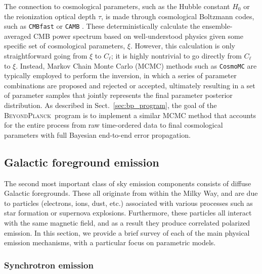 \documentclass[onecolumn]{aa}
\newcommand{\BP}{\textsc{BeyondPlanck}}
\begin{document}
The connection to cosmological parameters, such as the Hubble constant
$H_0$ or the reionization optical depth $\tau$, is made through
cosmological Boltzmann codes, such as \texttt{CMBfast}
\citep{seljak:1996} or \texttt{CAMB} \citep{Lewis:1999bs}. These
deterministically calculate the ensemble-averaged CMB power spectrum
based on well-understood physics given some specific set of
cosmological parameters, $\xi$. However, this calculation is only
straightforward going from $\xi$ to $C_{\ell}$; it is highly
nontrivial to go directly from $C_{\ell}$ to $\xi$. Instead, Markov
Chain Monte Carlo (MCMC) methods such as \texttt{CosmoMC}
\citep{cosmomc} are typically employed to perform the inversion, in
which a series of parameter combinations are proposed and rejected or
accepted, ultimately resulting in a set of parameter samples that
jointly represents the final parameter posterior distribution. As
described in Sect.~\ref{sec:bp_program}, the goal of the \BP\ program
is to implement a similar MCMC method that accounts for the entire
process from raw time-ordered data to final cosmological parameters
with full Bayesian end-to-end error propagation.

\subsection{Galactic foreground emission}
\label{sec:gal_fg}

The second most important class of sky emission components consists of diffuse
Galactic foregrounds. These all originate from within the Milky Way,
and are due to particles (electrons, ions, dust, etc.) associated with
various processes such as star formation or supernova
explosions. Furthermore, these particles all interact with the same
magnetic field, and as a result they produce correlated polarized
emission. In this section, we provide a brief survey of each of the
main physical emission mechanisms, with a particular focus on
parametric models.

\subsubsection{Synchrotron emission}
\label{sec:synchrotron}
\end{document}
